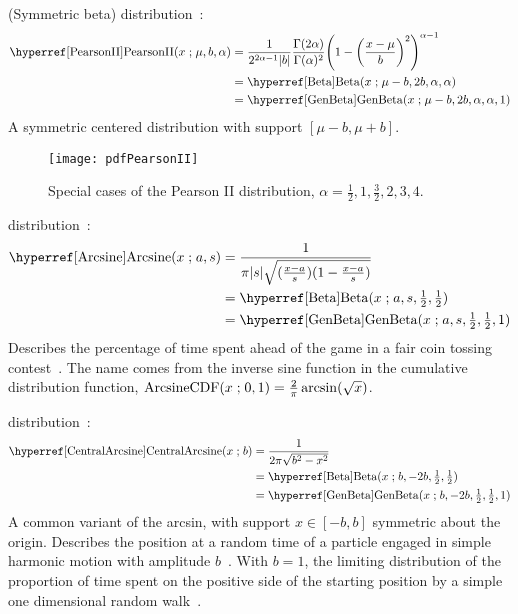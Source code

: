  (Symmetric beta) distribution~\cite{Pearson1895}: 
%
\begin{align}
\label{PearsonII}
\opr{PearsonII}(x\given \mu, b,\alpha) 
&= \frac{1}{2^{2\alpha-1}  |b|}\frac{\Gamma(2\alpha) }{ \Gamma(\alpha)^2 } \Left(1-\Left(\frac{x-\mu}{ b}\Right)^2 \Right)^{\alpha-1}
\checked
 \\
& = \opr{Beta}(x\given \mu-b, 2b,\alpha, \alpha) 
\notag  \checked \\
& = \opr{GenBeta}(x\given \mu-b, 2 b ,\alpha, \alpha,1) \notag
\checked
\end{align}
A symmetric centered distribution with support $[\mu-b, \mu+b]$.

\begin{figure}[tp!]
\begin{center}
\texttt{[image: pdfPearsonII]}
\end{center}
\caption[Pearson II distributions]{Special cases of the Pearson II distribution, $\alpha=\tfrac{1}{2}, 1, \tfrac{3}{2}, 2, 3, 4$.}
\end{figure}


 distribution~\cite{Norton1975}:
\begin{align}
\label{Arcsine}
\opr{Arcsine}(x\given a, s) &= \frac{1}{\pi |s| \sqrt{(\tfrac{x-a}{s}) (1-\frac{x-a}{s} )}} \checked \\
& =\opr{Beta}(x\given a,s,   \tfrac{1}{2},  \tfrac{1}{2}) \notag \checked \\
& =\opr{GenBeta}(x\given a,s, \tfrac{1}{2}, \tfrac{1}{2},1) \notag \checked
\end{align}
Describes the percentage of time spent ahead of the game in a fair coin tossing contest~\cite{Johnson1995,Norton1975}. The name comes from the inverse sine function in the cumulative distribution function,
$
\operatorname{ArcsineCDF}(x\mathrel{;} 0,1) = \frac{2}{\pi} \operatorname{arcsin}( \sqrt{x}) 
$.



 
 distribution~\cite{Norton1975}: 
\begin{align}
\label{CentralArcsine}
\opr{CentralArcsine}(x\given b) &= \frac{1}{2 \pi  \sqrt{b^2-x^2}} \checked \\
& =\opr{Beta}(x\given b,-2b, \tfrac{1}{2}, \tfrac{1}{2})  \checked \notag \\
& =\opr{GenBeta}(x\given b,-2b, \tfrac{1}{2}, \tfrac{1}{2},1)  \checked \notag
\end{align}
A common variant of the arcsin, with support $x\in [-b,b]$ symmetric about the origin. Describes the position at a random time of a particle engaged in simple harmonic motion with amplitude $b$~\cite{Norton1975}. With $b=1$, the limiting distribution of the proportion of time spent on the positive side of the starting position by a simple one dimensional random walk~\cite{Feller1968}.


